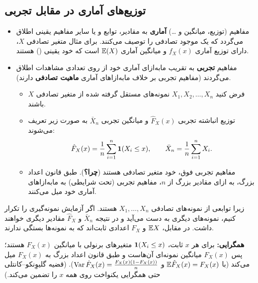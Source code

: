 \subsection{توزیع‌های آماری  در مقابل تجربی }
\begin{itemize}
\item مفاهیم (توزیع، میانگین و \ldots) \textbf{آماری} به مقادیر، توابع و یا سایر مفاهیم یقینی اطلاق می‌گردد که یک موجود تصادفی را توصیف می‌کنند. برای مثال متغیر تصادفی $X$، دارای توزیع آماری $f_X(x)$ و میانگین آماری $\mathbb{E}(X)$ است که خود یقینی () هستند.
\item مفاهیم \textbf{تجربی} به تقریب مابه‌ازای آماری خود از روی تعدادی مشاهدات اطلاق می‌گردند (مفاهیم تجربی بر خلاف مابه‌ازاهای آماری \textbf{ماهیت تصادفی} دارند).
\begin{itemize}
\item فرض کنید $X_1,X_2,\ldots,X_n$ نمونه‌های مستقل گرفته شده از متغیر تصادفی $X$ باشند.
\item توزیع انباشته تجربی $\hat F_X(x)$ و میانگین تجربی $\bar X_n$ به صورت زیر تعریف می‌شوند:
\[
\hat F_X(x)=\frac1n\sum_{i=1}^{n}\mathbf{1}(X_i\le x),\qquad \bar X_n=\frac1n\sum_{i=1}^{n}X_i .
\]
\item مفاهیم تجربی فوق، خود متغیر تصادفی هستند (\textbf{چرا؟}). طبق قانون اعداد بزرگ، به ازای مقادیر بزرگ از $n$، مفاهیم تجربی (تحت شرایطی) به مابه‌ازاهای آماری خود میل می‌کنند.
\end{itemize}
\end{itemize}

\begin{question}
\begin{answer}
زیرا توابعی از نمونه‌های تصادفی $X_1,\ldots,X_n$ هستند. اگر آزمایش نمونه‌گیری را تکرار کنیم، نمونه‌های دیگری به دست می‌آید و در نتیجه $\bar X_n$ و $\hat F_X$ مقادیر دیگری خواهند داشت. در مقابل، $\mathbb{E} X$ و $F_X$ اعدادی ثابت‌اند که به نمونه‌ها بستگی ندارند.

\textbf{همگرایی:} برای هر $x$ ثابت، $\mathbf{1}(X_i\le x)$ متغیرهای برنولی  با میانگین $F_X(x)$ هستند؛ پس $\hat F_X(x)$ میانگین نمونه‌ای آن‌هاست و طبق قانون اعداد بزرگ به $F_X(x)$ میل می‌کند (با $\mathbb{E}\hat F_X(x)=F_X(x)$ و $\operatorname{Var}\hat F_X(x)=\frac{F_X(x)(1-F_X(x))}{n}$). (قضیه گلیوِنکو--کانتلی حتی همگرایی یکنواخت روی همه $x$ را تضمین می‌کند.)
\end{answer}
\end{question}

